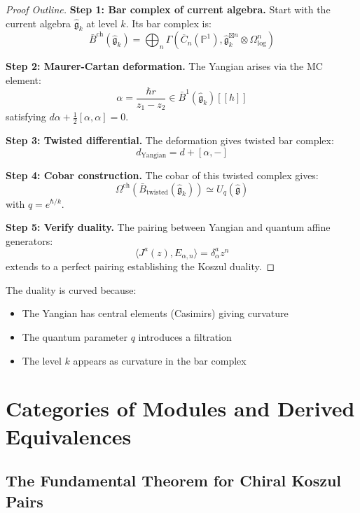 \begin{proof}[Proof Outline]
\textbf{Step 1: Bar complex of current algebra.}
Start with the current algebra $\hat{\mathfrak{g}}_k$ at level $k$. Its bar complex is:
$$\bar{B}^{\text{ch}}(\hat{\mathfrak{g}}_k) = \bigoplus_n \Gamma(\overline{C}_n(\mathbb{P}^1), \hat{\mathfrak{g}}_k^{\boxtimes n} \otimes \Omega^n_{\log})$$

\textbf{Step 2: Maurer-Cartan deformation.}
The Yangian arises via the MC element:
$$\alpha = \frac{\hbar r}{z_1 - z_2} \in \bar{B}^1(\hat{\mathfrak{g}}_k)[[h]]$$
satisfying $d\alpha + \frac{1}{2}[\alpha,\alpha] = 0$.

\textbf{Step 3: Twisted differential.}
The deformation gives twisted bar complex:
$$d_{\text{Yangian}} = d + [\alpha, -]$$

\textbf{Step 4: Cobar construction.}
The cobar of this twisted complex gives:
$$\Omega^{\text{ch}}(\bar{B}_{\text{twisted}}(\hat{\mathfrak{g}}_k)) \simeq U_q(\hat{\mathfrak{g}})$$
with $q = e^{\hbar/k}$.

\textbf{Step 5: Verify duality.}
The pairing between Yangian and quantum affine generators:
$$\langle J^a(z), E_{\alpha,n} \rangle = \delta^a_\alpha z^n$$
extends to a perfect pairing establishing the Koszul duality.
\end{proof}

\begin{remark}
The duality is curved because:
\begin{itemize}
\item The Yangian has central elements (Casimirs) giving curvature
\item The quantum parameter $q$ introduces a filtration
\item The level $k$ appears as curvature in the bar complex
\end{itemize}
\end{remark}


\section{Categories of Modules and Derived Equivalences}

\subsection{The Fundamental Theorem for Chiral Koszul Pairs}

